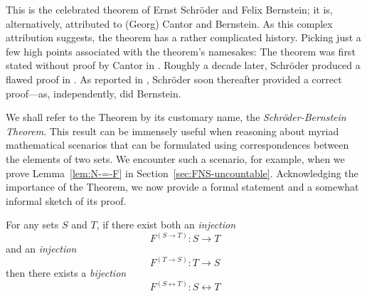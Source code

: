 
\noindent
This is the celebrated theorem of Ernst Schr\"{o}der and Felix Bernstein; it is, alternatively, attributed to (Georg) Cantor and Bernstein.  As this complex attribution suggests, the theorem has a rather complicated history.  Picking just a few high points associated with the theorem's namesakes: The theorem was first stated without proof by Cantor in \cite{Cantor87}.  Roughly a decade later, Schr\"{o}der produced a flawed proof in \cite{Schroeder98a}.  As reported in \cite{Deiser2010}, Schr\"{o}der soon thereafter provided a correct proof---as, independently, did Bernstein.

We shall refer to the Theorem by its customary name, the {\it Schr\"{o}der-Bernstein Theorem}. This result can be immensely useful when reasoning about myriad mathematical scenarios that can be formulated using correspondences between the elements of two sets.  We encounter such a scenario, for example, when we prove Lemma~\ref{lem:N-=-F} in Section~\ref{sec:FNS-uncountable}.  Acknowledging the importance of the Theorem, we now provide a formal statement and a somewhat informal sketch of its proof.

\begin{theorem}
\label{thm.S-B}
For any sets $S$ and $T$, if there exist both an {\em injection}
\[ F^{(S \rightarrow T)}: S \rightarrow T \]
and an {\em injection}
\[ F^{(T \rightarrow S)}: T \rightarrow S \]
then there exists a {\em bijection}
\[ F^{(S \leftrightarrow T)}: S \leftrightarrow T \]
\end{theorem}

